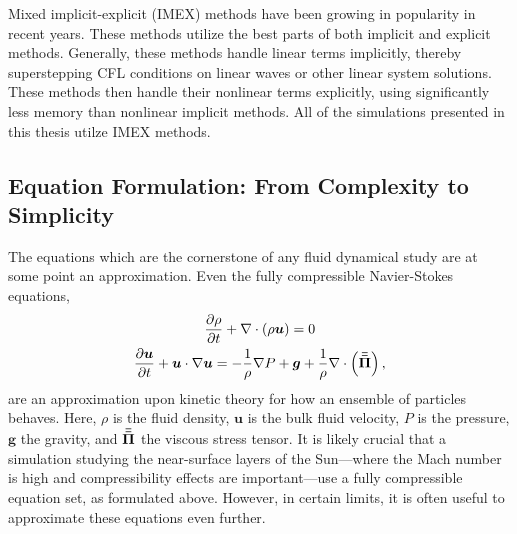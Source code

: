 Mixed implicit-explicit (IMEX) methods have been growing in popularity in recent years.
These methods utilize the best parts of both implicit and explicit methods.
Generally, these methods handle linear terms implicitly, thereby superstepping CFL conditions on linear waves or other linear system solutions.
These methods then handle their nonlinear terms explicitly, using significantly less memory than nonlinear implicit methods.
All of the simulations presented in this thesis utilze IMEX methods.


\subsection{Equation Formulation: From Complexity to Simplicity}
\label{sct:intro_equations}
The equations which are the cornerstone of any fluid dynamical study are at some point an approximation.
Even the fully compressible Navier-Stokes equations,
\begin{gather}
\frac{\partial \rho}{\partial t} + \nabla\cdot\left( \rho\bm{u}\right) = 0 
\label{eqn:intro_fc_continuity}
\\
\frac{\partial \bm{u}}{\partial t} + \bm{u}\cdot\nabla\bm{u} = -\frac{1}{\rho}\nabla P + \bm{g} + \frac{1}{\rho}\nabla\cdot\left( \bm{\bar{\bar{\Pi}}}\right),
\label{eqn:intro_fc_momentum}
\end{gather}
are an approximation upon kinetic theory for how an ensemble of particles behaves.
Here, $\rho$ is the fluid density, $\bm{u}$ is the bulk fluid velocity, $P$ is the pressure, $\bm{g}$ the gravity, and $\bm{\bar{\bar{\Pi}}}$ the viscous stress tensor.
It is likely crucial that a simulation studying the near-surface layers of the Sun---where the Mach number is high and compressibility effects are important---use a fully compressible equation set, as formulated above.
However, in certain limits, it is often useful to approximate these equations even further.

